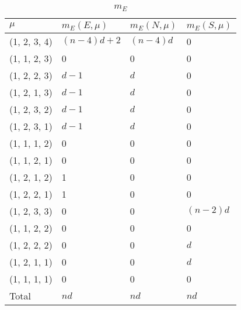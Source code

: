 \documentclass{article}
\begin{document}
\begin{table}[h]
\centering
\begin{tabular}{llll}
\multicolumn{1}{l|}{$\mu$}        & $m_E(E, \mu)$ & $m_E(N, \mu)$ & $m_E(S, \mu)$ \\ \hline
\multicolumn{1}{l|}{(1, 2, 3, 4)} & $(n-4)d+2$      & $(n-4)d$        & 0             \\
\multicolumn{1}{l|}{(1, 1, 2, 3)} & 0             & 0             & 0             \\
\multicolumn{1}{l|}{(1, 2, 2, 3)} & $d-1$           & $d$             & 0             \\
\multicolumn{1}{l|}{(1, 2, 1, 3)} & $d-1$           & $d$             & 0             \\
\multicolumn{1}{l|}{(1, 2, 3, 2)} & $d-1$           & $d$             & 0             \\
\multicolumn{1}{l|}{(1, 2, 3, 1)} & $d-1$           & $d$             & 0             \\
\multicolumn{1}{l|}{(1, 1, 1, 2)} & 0             & 0             & 0             \\
\multicolumn{1}{l|}{(1, 1, 2, 1)} & 0             & 0             & 0             \\
\multicolumn{1}{l|}{(1, 2, 1, 2)} & 1             & 0             & 0             \\
\multicolumn{1}{l|}{(1, 2, 2, 1)} & 1             & 0             & 0             \\
\multicolumn{1}{l|}{(1, 2, 3, 3)} & 0             & 0             & $(n-2)d$        \\
\multicolumn{1}{l|}{(1, 1, 2, 2)} & 0             & 0             & 0             \\
\multicolumn{1}{l|}{(1, 2, 2, 2)} & 0             & 0             & $d$             \\
\multicolumn{1}{l|}{(1, 2, 1, 1)} & 0             & 0             & $d$             \\
\multicolumn{1}{l|}{(1, 1, 1, 1)} & 0             & 0             & 0             \\ \hline
\multicolumn{1}{l|}{Total}                             & $nd$            & $nd$            & $nd$           
\end{tabular}
\caption{$m_E$}
\label{table:mE}
\end{table}
\end{document}

